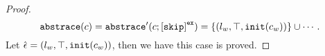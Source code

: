 \begin{proof}
      \[
        \absflow(c) = \absflow'(c; \clabel{\eskip}^{\lex}) = \{(l_w, \top, \init(c_w))\} \cup \cdots.
      \]
      Let $\hat{\mathtt{\epsilon}{}} = (l_w, \top, \mathtt{init}(c_w))$, then we have this case is proved.

\end{proof}
